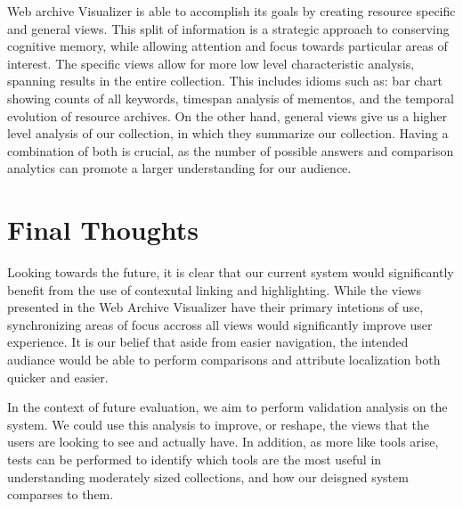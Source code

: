 \documentclass[10pt,journal,compsoc]{IEEEtran}
\begin{document}
Web archive Visualizer is able to accomplish its goals by creating resource specific and general views. This split of information is a strategic approach to conserving cognitive memory, while allowing attention and focus towards particular areas of interest. The specific views allow for more low level characteristic analysis, spanning results in the entire collection. This includes idioms such as: bar chart showing counts of all keywords, timespan analysis of mementos, and the temporal evolution of resource archives. On the other hand, general views give us a higher level analysis of our collection, in which they summarize our collection. Having a combination of both is crucial, as the number of possible answers and comparison analytics can promote a larger understanding for our audience. \par

\section{Final Thoughts}
Looking towards the future, it is clear that our current system would significantly benefit from the use of contexutal linking and highlighting. While the views presented in the Web Archive Visualizer have their primary intetions of use, synchronizing areas of focus accross all views would significantly improve user experience. It is our belief that aside from easier navigation, the intended audiance would be able to perform comparisons and attribute localization both quicker and easier. \par

In the context of future evaluation, we aim to perform validation analysis on the system. We could use this analysis to improve, or reshape, the views that the users are looking to see and actually have. In addition, as more like tools arise, tests can be performed to identify which tools are the most useful in understanding moderately sized collections, and how our deisgned system comparses to them. \par


\ifCLASSOPTIONcaptionsoff
  \newpage
\fi




{}


%
%
\end{document}

